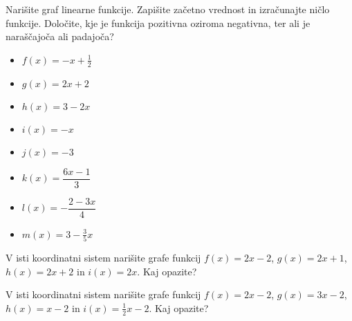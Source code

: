         


        
            \begin{naloga}
                Narišite graf linearne funkcije. Zapišite začetno vrednost in izračunajte ničlo funkcije.
                Določite, kje je funkcija pozitivna oziroma negativna, ter ali je naraščajoča ali padajoča?
                \begin{multicols}{2}    
                \begin{itemize}
                        \item $f(x)=-x+\frac{1}{2}$ 
                        \item $g(x)=2x+2$ 
                        \item $h(x)=3-2x$ 
                        \item $i(x)=-x$ 
                        \item $j(x)=-3$ 
                        \item $k(x)=\dfrac{6x-1}{3}$ 
                        \item $l(x)=-\dfrac{2-3x}{4}$ 
                        \item $m(x)=3-\frac{3}{5}x$ 
                    \end{itemize}
                \end{multicols}
            \end{naloga}
        


        
            \begin{naloga}
                V isti koordinatni sistem narišite grafe funkcij $f(x)=2x-2$, $g(x)=2x+1$, $h(x)=2x+2$ in $i(x)=2x$.
                Kaj opazite? 
            \end{naloga}

            \begin{naloga}
                V isti koordinatni sistem narišite grafe funkcij $f(x)=2x-2$, $g(x)=3x-2$, $h(x)=x-2$ in $i(x)=\frac{1}{2}x-2$.
                Kaj opazite? 
            \end{naloga}

        


    

